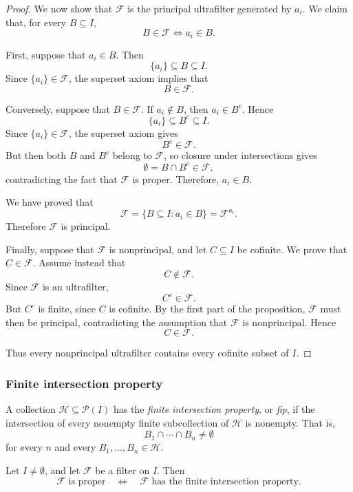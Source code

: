 {\begin{proof}
We now show that $\mathcal{F}$ is the principal ultrafilter generated by
$a_i$. We claim that, for every $B\subseteq I$,
\[
B\in\mathcal{F}
\iff
a_i\in B.
\]

First, suppose that $a_i\in B$. Then
\[
\{a_i\}\subseteq B\subseteq I.
\]
Since $\{a_i\}\in\mathcal{F}$, the superset axiom implies that
\[
B\in\mathcal{F}.
\]

Conversely, suppose that $B\in\mathcal{F}$. If $a_i\notin B$, then
$a_i\in B^c$. Hence
\[
\{a_i\}\subseteq B^c\subseteq I.
\]
Since $\{a_i\}\in\mathcal{F}$, the superset axiom gives
\[
B^c\in\mathcal{F}.
\]
But then both $B$ and $B^c$ belong to $\mathcal{F}$, so closure under
intersections gives
\[
\emptyset=B\cap B^c\in\mathcal{F},
\]
contradicting the fact that $\mathcal{F}$ is proper. Therefore,
$a_i\in B$.

We have proved that
\[
\mathcal{F}
=
\{B\subseteq I:a_i\in B\}
=
\mathcal{F}^{a_i}.
\]
Therefore $\mathcal{F}$ is principal.

Finally, suppose that $\mathcal{F}$ is nonprincipal, and let $C\subseteq I$
be cofinite. We prove that $C\in\mathcal{F}$. Assume instead that
\[
C\notin\mathcal{F}.
\]
Since $\mathcal{F}$ is an ultrafilter,
\[
C^c\in\mathcal{F}.
\]
But $C^c$ is finite, since $C$ is cofinite. By the first part of the
proposition, $\mathcal{F}$ must then be principal, contradicting the
assumption that $\mathcal{F}$ is nonprincipal. Hence
\[
C\in\mathcal{F}.
\]

Thus every nonprincipal ultrafilter contains every cofinite subset of $I$.
\end{proof}

\subsubsection{Finite intersection property}

\begin{defn}
A collection \(\mathcal{H} \subseteq \mathcal{P}(I)\) has the
\emph{finite intersection property}, or \emph{fip}, if the intersection of
every nonempty finite subcollection of \(\mathcal{H}\) is nonempty. That is,
\[
B_1 \cap \cdots \cap B_n \neq \emptyset
\]
for every \(n\) and every \(B_1,\ldots,B_n \in \mathcal{H}\).
\end{defn}

\begin{prop}
\label{prop:proper-filter-iff-fip}
Let \(I\neq\emptyset\), and let \(\mathcal{F}\) be a filter on \(I\).
Then
\[
\mathcal{F}\text{ is proper}
\quad\Longleftrightarrow\quad
\mathcal{F}\text{ has the finite intersection property}.
\]
\end{prop}

}
